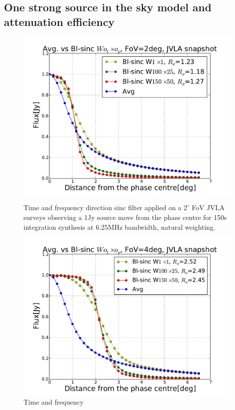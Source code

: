 \documentclass[useAMS,usenatbib]{mn2e}
\begin{document}
\subsection{One strong source in the sky model and attenuation efficiency}
 \begin{figure}
    \centering
  \begin{minipage}{0.36\linewidth}\includegraphics[width=1\textwidth]{./Figures/Bl-sinc-FoV2-vla.pdf}\caption{Time and frequency 
  direction sinc filter applied on a $2^{\circ}$ FoV JVLA surveys observing a 1Jy source move from the phase centre for 150s integration 
  synthesis at 6.25MHz bandwidth, natural weighting.}\label{fig:Bl-sinc-FoV2}\end{minipage}
  \hspace{1cm}
  \begin{minipage}{0.36\linewidth}\includegraphics[width=1\textwidth]{./Figures/Bl-sinc-FoV4-vla.pdf}\caption{Time and frequency 
}
\end{minipage}
\end{figure}
\end{document}
